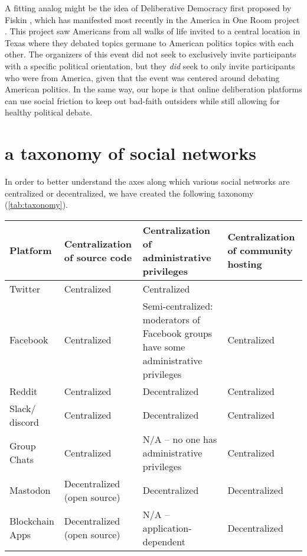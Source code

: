\documentclass[sigconf,authordraft]{acmart}
\begin{document}
A fitting analog might be the idea of Deliberative Democracy first proposed by Fiskin \cite{fishkin1991democracy}, which has manifested most recently in the America in One Room project \cite{AmericaInOneRoom}. This project saw Americans from all walks of life invited to a central location in Texas where they debated topics germane to American politics topics with each other. The organizers of this event did not seek to exclusively invite participants with a specific political orientation, but they {\itshape did} seek to only invite participants who were from America, given that the event was centered around debating American politics. In the same way, our hope is that online deliberation platforms can use social friction to keep out bad-faith outsiders while still allowing for healthy political debate.

\section{a taxonomy of social networks}

In order to better understand the axes along which various social networks are centralized or decentralized, we have created the following taxonomy (\ref{tab:taxonomy}).


\begin{table*}
  \caption{A taxonomy of online networks}
  \label{tab:taxonomy}
  \begin{tabularx}{\textwidth}{llXX}
    \toprule
    Platform & Centralization of source code & Centralization of administrative privileges & Centralization of community hosting \\
    \midrule
    Twitter  & Centralized & Centralized\\
    Facebook & Centralized & Semi-centralized: moderators of Facebook groups have some administrative privileges & Centralized\\
    Reddit   & Centralized & Decentralized & Centralized  \\
    Slack/ discord & Centralized & Decentralized & Centralized \\
    Group Chats & Centralized & N/A -- no one has administrative privileges & Centralized \\
    Mastodon & Decentralized (open source) & Decentralized & Decentralized\\
    Blockchain Apps & Decentralized (open source) & N/A -- application-dependent & Decentralized\\
    \bottomrule
  \end{tabularx}
\end{table*}
\end{document}
